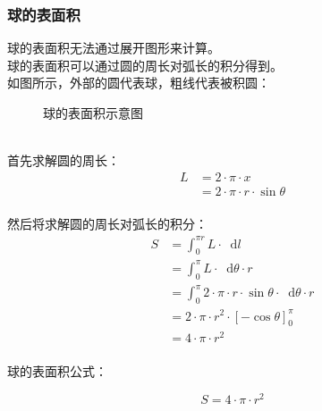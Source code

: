 \documentclass[UTF8]{ctexart}
\newcommand*{\dif}{\mathop{}\!\mathrm{d}}
\begin{document}
\newpage

\subsubsection{球的表面积}
    球的表面积无法通过展开图形来计算。\\[3mm]
    球的表面积可以通过圆的周长对弧长的积分得到。\\[3mm]
    如图所示，外部的圆代表球，粗线代表被积圆：\vspace{3pt}
    \begin{figure}[h]
        \begin{center}
            \caption{球的表面积示意图}
        \end{center}
    \end{figure}\\
    首先求解圆的周长：
    \setcounter{equation}{0}
    \begin{align}
        L
        &=2\cdot\pi\cdot x\\[3mm]
        &=2\cdot\pi\cdot r\cdot\sin{\theta}
    \end{align}\\
    然后将求解圆的周长对弧长的积分：\vspace{5pt}
    \begin{align}
        S
        &=\int_0^{\pi r}L\cdot \dif l\\[3mm]
        &=\int_0^{\pi}L\cdot \dif\theta\cdot r\\[3mm]
        &=\int_0^{\pi}2\cdot\pi\cdot r\cdot\sin{\theta}\cdot \dif\theta\cdot r\\[3mm]
        &=2\cdot\pi\cdot r^2\cdot\left[-\cos{\theta}\right]_0^\pi\\[3mm]
        &=4\cdot\pi\cdot r^2
    \end{align}\\
    球的表面积公式：
    \begin{large}
        \begin{equation*}
            S=4\cdot\pi\cdot r^2
        \end{equation*}
    \end{large}
\end{document}
